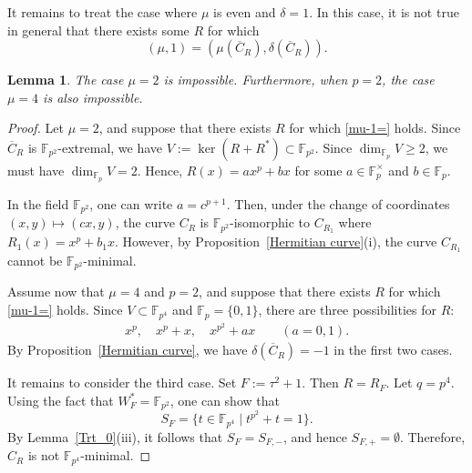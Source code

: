 \documentclass[12pt,a4paper]{amsart}
\newtheorem{lemma}[theorem]{Lemma}
\theoremstyle{definition}
\def\F{{\mathbb F}}
\theoremstyle{remark}
\begin{document}
It remains to treat the case where $\mu$ is even and $\delta=1$. In this case, it is not true in general that there exists some $R$ for which 
\begin{equation}\label{mu-1=}
    (\mu,1)=(\mu(\overline{C}_R),\delta(\overline{C}_R)). 
\end{equation}
\begin{lemma}
    The case $\mu=2$ is impossible. Furthermore, when $p=2$, the case $\mu=4$ is also impossible. 
\end{lemma}
\begin{proof}
    Let $\mu=2$, and suppose that there exists $R$ for which \eqref{mu-1=} holds. 
    Since $\overline{C}_R$ is $\F_{p^2}$-extremal, we have $V:=\ker(R+R^\ast)\subset \F_{p^2}$. Since $\dim_{\F_p}V\geq2$, we must have $\dim_{\F_p}V=2$. Hence, $R(x)=ax^p+bx$ for some $a\in \F_p^\times$ and $b\in\F_p$. 

    In the field $\F_{p^2}$, one can write $a=c^{p+1}$. Then, under the change of coordinates $(x,y)\mapsto (cx,y)$, the curve $C_R$ is $\F_{p^2}$-isomorphic to $C_{R_1}$ where $R_1(x)=x^p+b_1x$. However, by Proposition~\ref{Hermitian curve}(i), the curve $C_{R_1}$ cannot be $\F_{p^2}$-minimal. 

    \medskip 
    
    \noindent
 Assume now that $\mu=4$ and $p=2$, and suppose that there exists $R$ for which \eqref{mu-1=} holds. Since $V\subset \F_{p^4}$ and $\F_p=\{0,1\}$, there are three possibilities for $R$: 
\begin{align*}
x^p, \quad x^p+x,\quad x^{p^2}+ax\qquad(a=0,1). 
\end{align*}
By Proposition~\ref{Hermitian curve}, we have $\delta(\overline{C}_R)=-1$ in the first two cases. 

It remains to consider the third case. 
Set $F:=\tau^2+1$. Then $R=R_F$. Let $q=p^4$. Using the fact that $W_F^\ast=\F_{p^2}$, one can show that  
\[
S_F=\{t\in\F_{p^4}\mid t^{p^2}+t=1\}. 
\]
By Lemma~\ref{Trt_0}(iii), it follows that $S_F=S_{F,-}$, and hence $S_{F,+}=\emptyset$. Therefore, $C_R$ is not $\F_{p^4}$-minimal. 
\end{proof}
\end{document}
